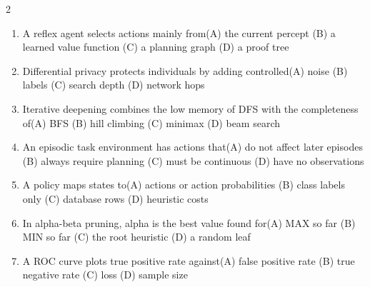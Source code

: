 \documentclass[a4paper]{article}
\begin{document}
\begin{multicols*}{2}
\fontsize{8.5}{10}\selectfont
\begin{enumerate}[resume]
\item A reflex agent selects actions mainly from\newline\hspace*{0.6em}(A) the current percept \quad (B) a learned value function \newline\hspace*{0.6em}(C) a planning graph \quad (D) a proof tree
\item Differential privacy protects individuals by adding controlled\newline\hspace*{0.6em}(A) noise \quad (B) labels \newline\hspace*{0.6em}(C) search depth \quad (D) network hops
\item Iterative deepening combines the low memory of DFS with the completeness of\newline\hspace*{0.6em}(A) BFS \quad (B) hill climbing \newline\hspace*{0.6em}(C) minimax \quad (D) beam search
\item An episodic task environment has actions that\newline\hspace*{0.6em}(A) do not affect later episodes \quad (B) always require planning \newline\hspace*{0.6em}(C) must be continuous \quad (D) have no observations
\item A policy maps states to\newline\hspace*{0.6em}(A) actions or action probabilities \quad (B) class labels only \newline\hspace*{0.6em}(C) database rows \quad (D) heuristic costs
\item In alpha-beta pruning, alpha is the best value found for\newline\hspace*{0.6em}(A) MAX so far \quad (B) MIN so far \newline\hspace*{0.6em}(C) the root heuristic \quad (D) a random leaf
\item A ROC curve plots true positive rate against\newline\hspace*{0.6em}(A) false positive rate \quad (B) true negative rate \newline\hspace*{0.6em}(C) loss \quad (D) sample size

\end{enumerate}
\end{multicols*}
\end{document}
